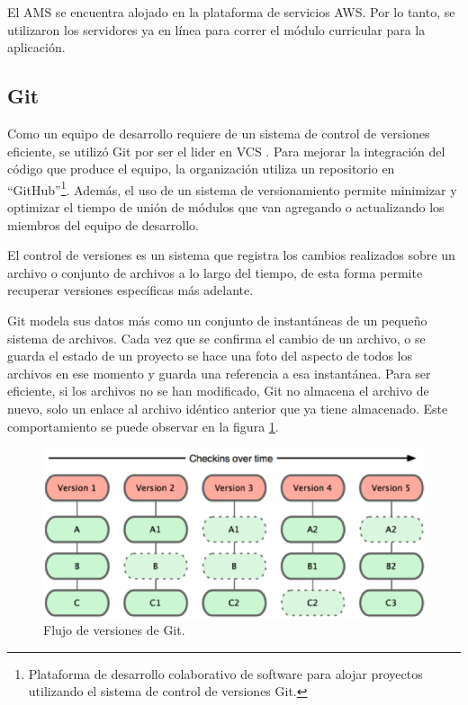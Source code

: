El AMS se encuentra alojado en la plataforma de servicios AWS. Por lo tanto, se utilizaron los servidores ya en línea para correr el módulo curricular para la aplicación.

\subsection{Git}
Como un equipo de desarrollo requiere de un sistema de control de versiones eficiente, se utilizó Git por ser el lider en VCS \citep{loeliger2012version}. Para mejorar la integración del código que produce el equipo, la organización utiliza un repositorio en \enquote{GitHub}\footnote{Plataforma de desarrollo colaborativo de software para alojar proyectos utilizando el sistema de control de versiones Git.}. Además, el uso de un sistema de versionamiento permite minimizar y optimizar el tiempo de unión de módulos que van agregando o actualizando los miembros del equipo de desarrollo.

El control de versiones es un sistema que registra los cambios realizados sobre un archivo o conjunto de archivos a lo largo del tiempo, de esta forma permite recuperar versiones específicas más adelante\citep{chacon2014pro}.

Git modela sus datos más como un conjunto de instantáneas de un pequeño sistema de archivos. Cada vez que se confirma el cambio de un archivo, o se guarda el estado de un proyecto se hace una foto del aspecto de todos los archivos en ese momento y guarda una referencia a esa instantánea. Para ser eficiente, si los archivos no se han modificado, Git no almacena el archivo de nuevo, solo un enlace al archivo idéntico anterior que ya tiene almacenado. Este comportamiento se puede observar en la figura \ref{graph_git}.

\begin{figure}[H]
\centering
\includegraphics[width=125mm,scale=1]{Figuras/tecnologias/git_over_time}
\caption{Flujo de versiones de Git.}
  \label{graph_git}
\end{figure}

